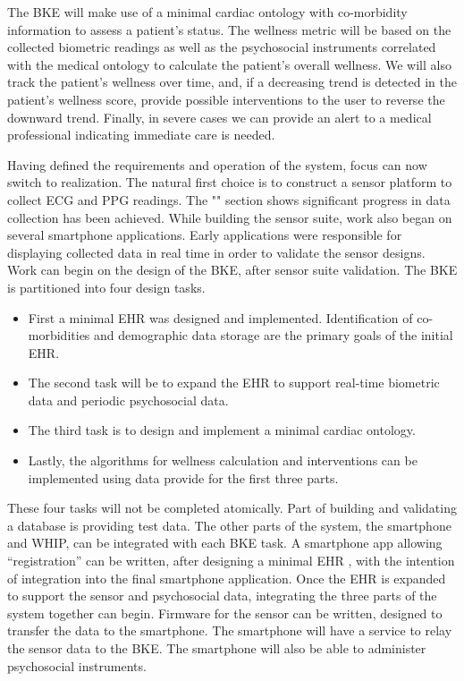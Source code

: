 The BKE will make use of a minimal cardiac ontology with co-morbidity information to assess a patient's status. The wellness metric will be based on the collected biometric readings as well as the psychosocial instruments correlated with the medical ontology to calculate the patient's overall wellness. We will also track the patient's wellness over time, and, if a decreasing trend is detected in the patient's wellness score, provide possible interventions to the user to reverse the downward trend. Finally, in severe cases we can provide an alert to a medical professional indicating immediate care is needed.

Having defined the requirements and operation of the system, focus can now switch to realization. The natural first choice is to construct a sensor platform to collect ECG and PPG readings. The "" section shows significant progress in data collection has been achieved. While building the sensor suite, work also began on several smartphone applications. Early applications were responsible for displaying collected data in real time in order to validate the sensor designs. Work can begin on the design of the BKE, after sensor suite validation. The BKE is partitioned into four design tasks. 
\begin{itemize}
\item First a minimal EHR was designed and implemented. Identification of co-morbidities and demographic data storage are the primary goals of the initial EHR.
\item The second task will be to expand the EHR to support real-time biometric data and periodic psychosocial data. 
\item The third task is to design and implement a minimal cardiac ontology.
\item Lastly, the algorithms for wellness calculation and interventions can be implemented using data provide for the first three parts.
\end{itemize}
These four tasks will not be completed atomically. Part of building and validating a database is providing test data. The other parts of the system, the smartphone and WHIP, can be integrated with each BKE task. A smartphone app allowing “registration” can be written, after designing a minimal EHR , with the intention of integration into the final smartphone application. Once the EHR is expanded to support the sensor and psychosocial data, integrating the three parts of the system together can begin. Firmware for the sensor can be written, designed to transfer the data to the smartphone.  The smartphone will have a service to relay the sensor data to the BKE. The smartphone will also be able to administer psychosocial instruments. 
